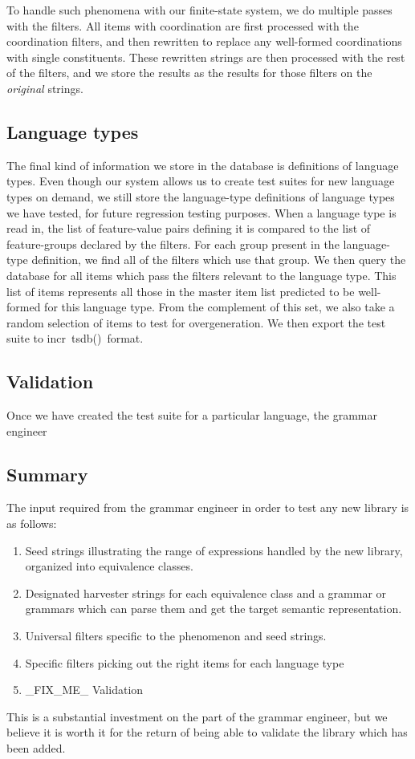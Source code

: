 \documentclass[11pt]{article}
\newcommand{\itsdb}{\mbox{\sf \lbrack incr tsdb()\rbrack}}
\begin{document}
To handle such phenomena with our finite-state system, we do multiple
passes with the filters.  All items with coordination are first processed
with the coordination filters, and then rewritten to replace any
well-formed coordinations with single constituents.  These rewritten
strings are then processed with the rest of the filters, and we store
the results as the results for those filters on the {\it original}
strings.

\subsection{Language types}

The final kind of information we store in the database is definitions
of language types.  Even though our system allows us to create test
suites for new language types on demand, we still store the
language-type definitions of language types we have tested, for future
regression testing purposes.  When a language type is read in, the
list of feature-value pairs defining it is compared to the list of
feature-groups declared by the filters.  For each group present in the
language-type definition, we find all of the filters which use that
group.  We then query the database for all items which pass the
filters relevant to the language type.  This list of items represents
all those in the master item list predicted to be well-formed for
this language type.  From the complement of this set, we also take
a random selection of items to test for overgeneration.  We then export
the test suite to \itsdb\ format.

\subsection{Validation}

Once we have created the test suite for a particular language, the
grammar engineer 

\subsection{Summary}

The input required from the grammar engineer in order to
test any new library is as follows:

\begin{enumerate}
\item Seed strings illustrating the range of expressions
handled by the new library, organized into equivalence
classes.
\item Designated harvester strings for each equivalence class
and a grammar or grammars which can parse them and get
the target semantic representation.
\item Universal filters specific to the phenomenon and
seed strings.
\item Specific filters picking out the right items for
each language type
\item \_FIX\_ME\_ Validation
\end{enumerate}
%
This is a substantial investment on the part of the grammar
engineer, but we believe it is worth it for the return of
being able to validate the library which has been added.
\end{document}
